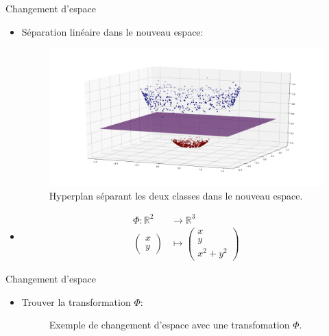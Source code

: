 \documentclass[8pt]{beamer}
\begin{document}
	\begin{frame}{Changement d'espace}
		\begin{itemize}
			\item <1-> Séparation linéaire dans le nouveau espace:
			\begin{figure}[H]
				\includegraphics[width=.5\textwidth]{images/samples/separation_x_2_y_2}
				\caption{ Hyperplan séparant les deux classes dans le nouveau espace.}

			\end{figure}
			\item <2-> \begin{align*}
				\Phi: \mathbb{R}^2 &\rightarrow \mathbb{R}^3 \\
				\begin{pmatrix}
					x \\
					y
				\end{pmatrix} &\mapsto \begin{pmatrix}
					x \\
					y \\
					x^2 + y^2
				\end{pmatrix}
			\end{align*}
		\end{itemize}
	\end{frame}
	\begin{frame}{Changement d'espace}
		\begin{itemize}
			\item  Trouver la transformation $\Phi$:
			\begin{figure}[H]
				{
					\caption{Exemple de changement d'espace avec une transfomation $\Phi$.}
				}
			\end{figure}
		\end{itemize}
	\end{frame}
\end{document}
